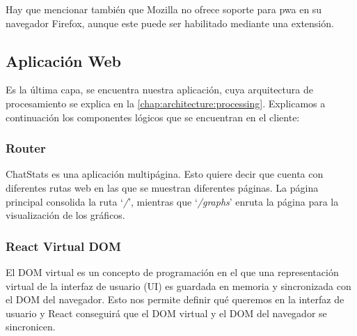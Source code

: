 Hay que mencionar también que Mozilla no ofrece soporte para \acrshort{pwa} en su navegador Firefox\cite{firefoxNoPWA}, aunque este puede ser habilitado mediante una extensión\cite{firefoxPWAextension}.

\subsection{Aplicación Web}

Es la última capa, se encuentra nuestra aplicación, cuya arquitectura de procesamiento se explica en la \autoref{chap:architecture:processing}. Explicamos a continuación los componentes lógicos que se encuentran en el cliente:

\subsubsection{Router}

ChatStats es una aplicación multipágina. Esto quiere decir que cuenta con diferentes rutas web en las que se muestran diferentes páginas. La página principal consolida la ruta `\textit{/}', mientras que `\textit{/graphs}' enruta la página para la visualización de los gráficos.

\subsubsection{React Virtual DOM}

El DOM virtual es un concepto de programación en el que una representación virtual de la interfaz de usuario (UI) es guardada en memoria y sincronizada con el DOM del navegador. Esto nos permite definir qué queremos en la interfaz de usuario y React conseguirá que el DOM virtual y el DOM del navegador se sincronicen.


\newpage
